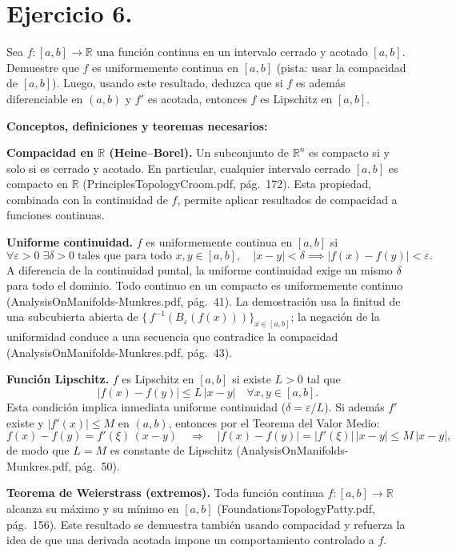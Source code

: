 \documentclass[a4paper,11pt]{article}  %
\begin{document}
\bigskip

\section*{Ejercicio 6.}
Sea \(f\colon [a,b]\to \mathbb{R}\) una función continua en un intervalo cerrado y acotado \([a,b]\). Demuestre que \(f\) es uniformemente continua en \([a,b]\) (pista: usar la compacidad de \([a,b]\)). Luego, usando este resultado, deduzca que si \(f\) es además diferenciable en \((a,b)\) y \(f'\) es acotada, entonces \(f\) es Lipschitz en \([a,b]\).

\medskip
\textbf{Conceptos, definiciones y teoremas necesarios:}

\textbf{Compacidad en \(\mathbb{R}\) (Heine--Borel).}  
Un subconjunto de \(\mathbb{R}^n\) es compacto si y solo si es cerrado y acotado. En particular, cualquier intervalo cerrado \([a,b]\) es compacto en \(\mathbb{R}\) (PrinciplesTopologyCroom.pdf, pág.\ 172). Esta propiedad, combinada con la continuidad de \(f\), permite aplicar resultados de compacidad a funciones continuas.

\textbf{Uniforme continuidad.}  
\(f\) es uniformemente continua en \([a,b]\) si
\[
\forall \varepsilon>0\;\exists \delta>0\;\text{tales que para todo }x,y\in[a,b],\quad |x-y|<\delta\implies|f(x)-f(y)|<\varepsilon.
\]
A diferencia de la continuidad puntal, la uniforme continuidad exige un mismo \(\delta\) para todo el dominio. Todo continuo en un compacto es uniformemente continuo (AnalysisOnManifolds-Munkres.pdf, pág.\ 41). La demostración usa la finitud de una subcubierta abierta de \(\{\,f^{-1}(B_\varepsilon(f(x)))\}_{x\in[a,b]}\); la negación de la uniformidad conduce a una secuencia que contradice la compacidad (AnalysisOnManifolds-Munkres.pdf, pág.\ 43).

\textbf{Función Lipschitz.}  
\(f\) es Lipschitz en \([a,b]\) si existe \(L>0\) tal que
\[
|f(x)-f(y)|\le L\,|x-y|\quad\forall x,y\in[a,b].
\]
Esta condición implica inmediata uniforme continuidad (\(\delta=\varepsilon/L\)). Si además \(f'\) existe y \(\lvert f'(x)\rvert\le M\) en \((a,b)\), entonces por el Teorema del Valor Medio:
\[
f(x)-f(y)=f'(\xi)\,(x-y)
\quad\Longrightarrow\quad
|f(x)-f(y)|=|f'(\xi)|\,|x-y|\le M\,|x-y|,
\]
de modo que \(L=M\) es constante de Lipschitz (AnalysisOnManifolds-Munkres.pdf, pág.\ 50).

\textbf{Teorema de Weierstrass (extremos).}  
Toda función continua \(f\colon[a,b]\to\mathbb{R}\) alcanza su máximo y su mínimo en \([a,b]\) (FoundationsTopologyPatty.pdf, pág.\ 156). Este resultado se demuestra también usando compacidad y refuerza la idea de que una derivada acotada impone un comportamiento controlado a \(f\).
\end{document}
